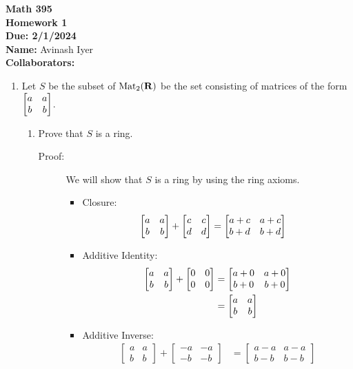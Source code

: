 \documentclass[11pt]{article}
\begin{document}
\begin{center}
{\bf \Large Math 395 \\[0.1in]Homework 1 \\[0.1in]
Due: 2/1/2024}\\[.25in]
{\bf Name:} {Avinash Iyer}\\[0.15in]
{\bf Collaborators:} {\underline{\hspace*{4.5in}}} \\
\end{center}

\begin{enumerate}

\item Let $S$ be the subset of $\operatorname{Mat}_{2}(\mathbf{R})$  be the set consisting of matrices of the form $\left[ \begin{matrix} a & a \\ b & b \end{matrix} \right]$. 
\begin{enumerate}
\item Prove that $S$ is a ring.\\
  \begin{description}
    \item[Proof:] We will show that $S$ is a ring by using the ring axioms.
      \begin{itemize}
        \item Closure:
          \begin{align*}
            \left[ \begin{matrix} a & a \\ b&b\end{matrix} \right] + \left[ \begin{matrix} c&c\\d&d\end{matrix} \right] &= \left[ \begin{matrix} a+c & a+c\\b+d & b+d\end{matrix} \right]
          \end{align*}
        \item Additive Identity:
          \begin{align*}
            \left[ \begin{matrix} a&a\\b&b\end{matrix} \right] + \left[ \begin{matrix} 0&0\\0&0\end{matrix} \right] &= \left[ \begin{matrix} a+0 & a+0\\b+0 & b+0\end{matrix} \right]\\
                   &= \begin{bmatrix}a&a\\b&b\end{bmatrix}
          \end{align*}
        \item Additive Inverse:
          \begin{align*}
            \begin{bmatrix}a&a\\b&b\end{bmatrix} + \begin{bmatrix}-a&-a \\ -b&-b\end{bmatrix} &= \begin{bmatrix}a-a&a-a\\b-b&b-b\end{bmatrix}\\

\end{align*}
\end{itemize}
\end{description}
\end{enumerate}
\end{enumerate}
\end{document}
